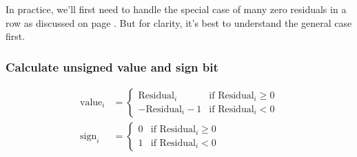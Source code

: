 In practice, we'll first need to handle the special case of many
zero residuals in a row as discussed on page \pageref{wavpack_zero_residuals}.
But for clarity, it's best to understand the general case first.

\subsubsection{Calculate unsigned value and sign bit}
\begin{align*}
\text{value}_i &=
\begin{cases}
\text{Residual}_i & \text{if } \text{Residual}_i \geq 0 \\
-\text{Residual}_i - 1 & \text{if } \text{Residual}_i < 0
\end{cases} \\
\text{sign}_i &=
\begin{cases}
0 & \text{if } \text{Residual}_i \geq 0 \\
1 & \text{if } \text{Residual}_i < 0
\end{cases}
\end{align*}
